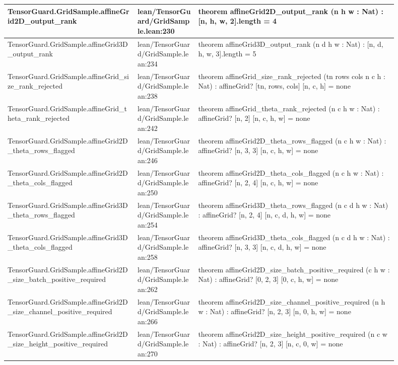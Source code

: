 \documentclass[10pt]{article}
\begin{document}
\begin{longtable}{|p{0.30\linewidth}|p{0.14\linewidth}|p{0.46\linewidth}|}
\hline
TensorGuard.GridSample.affineGrid2D\_output\_rank & lean/TensorGuard/GridSample.lean:230 & theorem affineGrid2D\_output\_rank (n h w : Nat) : [n, h, w, 2].length = 4 \\
\hline
TensorGuard.GridSample.affineGrid3D\_output\_rank & lean/TensorGuard/GridSample.lean:234 & theorem affineGrid3D\_output\_rank (n d h w : Nat) : [n, d, h, w, 3].length = 5 \\
\hline
TensorGuard.GridSample.affineGrid\_size\_rank\_rejected & lean/TensorGuard/GridSample.lean:238 & theorem affineGrid\_size\_rank\_rejected (tn rows cols n c h : Nat) : affineGrid? [tn, rows, cols] [n, c, h] = none \\
\hline
TensorGuard.GridSample.affineGrid\_theta\_rank\_rejected & lean/TensorGuard/GridSample.lean:242 & theorem affineGrid\_theta\_rank\_rejected (n c h w : Nat) : affineGrid? [n, 2] [n, c, h, w] = none \\
\hline
TensorGuard.GridSample.affineGrid2D\_theta\_rows\_flagged & lean/TensorGuard/GridSample.lean:246 & theorem affineGrid2D\_theta\_rows\_flagged (n c h w : Nat) : affineGrid? [n, 3, 3] [n, c, h, w] = none \\
\hline
TensorGuard.GridSample.affineGrid2D\_theta\_cols\_flagged & lean/TensorGuard/GridSample.lean:250 & theorem affineGrid2D\_theta\_cols\_flagged (n c h w : Nat) : affineGrid? [n, 2, 4] [n, c, h, w] = none \\
\hline
TensorGuard.GridSample.affineGrid3D\_theta\_rows\_flagged & lean/TensorGuard/GridSample.lean:254 & theorem affineGrid3D\_theta\_rows\_flagged (n c d h w : Nat) : affineGrid? [n, 2, 4] [n, c, d, h, w] = none \\
\hline
TensorGuard.GridSample.affineGrid3D\_theta\_cols\_flagged & lean/TensorGuard/GridSample.lean:258 & theorem affineGrid3D\_theta\_cols\_flagged (n c d h w : Nat) : affineGrid? [n, 3, 3] [n, c, d, h, w] = none \\
\hline
TensorGuard.GridSample.affineGrid2D\_size\_batch\_positive\_required & lean/TensorGuard/GridSample.lean:262 & theorem affineGrid2D\_size\_batch\_positive\_required (c h w : Nat) : affineGrid? [0, 2, 3] [0, c, h, w] = none \\
\hline
TensorGuard.GridSample.affineGrid2D\_size\_channel\_positive\_required & lean/TensorGuard/GridSample.lean:266 & theorem affineGrid2D\_size\_channel\_positive\_required (n h w : Nat) : affineGrid? [n, 2, 3] [n, 0, h, w] = none \\
\hline
TensorGuard.GridSample.affineGrid2D\_size\_height\_positive\_required & lean/TensorGuard/GridSample.lean:270 & theorem affineGrid2D\_size\_height\_positive\_required (n c w : Nat) : affineGrid? [n, 2, 3] [n, c, 0, w] = none \\

\end{longtable}
\end{document}
